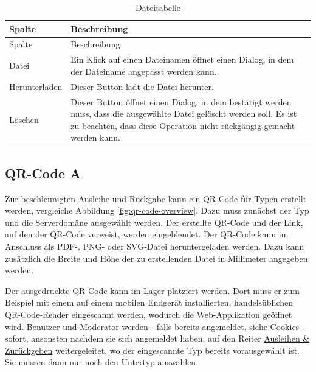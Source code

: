 \documentclass[
]{article}
\begin{document}
\begin{longtable}[]{@{}
  >{\raggedright\arraybackslash}p{}
  >{\raggedright\arraybackslash}p{}@{}}
\caption{\label{tab:file-table} Dateitabelle}\tabularnewline
\toprule
Spalte & Beschreibung \\
\midrule
\endfirsthead
\toprule
Spalte & Beschreibung \\
\midrule
\endhead
Datei & Ein Klick auf einen Dateinamen öffnet einen Dialog, in dem der Dateiname angepasst werden kann. \\
Herunterladen & Dieser Button lädt die Datei herunter. \\
Löschen & Dieser Button öffnet einen Dialog, in dem bestätigt werden muss, dass die ausgewählte Datei gelöscht werden soll. Es ist zu beachten, dass diese Operation nicht rückgängig gemacht werden kann. \\
\bottomrule
\end{longtable}

\hypertarget{qrcode}{%
\subsection{QR-Code A}\label{qrcode}}

Zur beschleunigten Ausleihe und Rückgabe kann ein QR-Code für Typen erstellt werden, vergleiche Abbildung \ref{fig:qr-code-overview}. Dazu muss zunächst der Typ und die Serverdomäne ausgewählt werden. Der erstellte QR-Code und der Link, auf den der QR-Code verweist, werden eingeblendet. Der QR-Code kann im Anschluss als PDF-, PNG- oder SVG-Datei heruntergeladen werden. Dazu kann zusätzlich die Breite und Höhe der zu erstellenden Datei in Millimeter angegeben werden.

Der ausgedruckte QR-Code kann im Lager platziert werden. Dort muss er zum Beispiel mit einem auf einem mobilen Endgerät installierten, handelsüblichen QR-Code-Reader eingescannt werden, wodurch die Web-Applikation geöffnet wird. Benutzer und Moderator werden - falls bereits angemeldet, siehe \protect\hyperlink{cookies}{Cookies} - sofort, ansonsten nachdem sie sich angemeldet haben, auf den Reiter \protect\hyperlink{operate}{Ausleihen \& Zurückgeben} weitergeleitet, wo der eingescannte Typ bereits vorausgewählt ist. Sie müssen dann nur noch den Untertyp auswählen.
\end{document}
